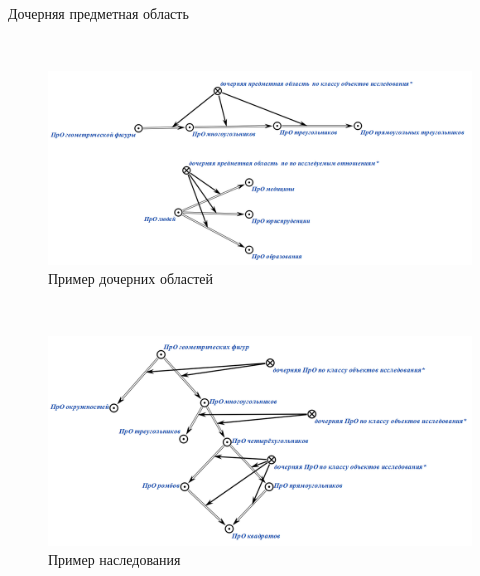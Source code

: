 \begin{frame}{\\Дочерняя предметная область}
	\begin{SCn}
	\end{SCn}
\end{frame}

\begin{frame}{\\}
	\begin{figure}[H]
		\includegraphics[scale=0.3]{./part1/pictures/example.png}
		\caption{Пример дочерних областей}
	\end{figure}
\end{frame}

\begin{frame}{\\}
	\begin{figure}[H]
		\includegraphics[scale=0.3]{./part1/pictures/inheritance.png}
		\caption{Пример наследования}
	\end{figure}
\end{frame}

